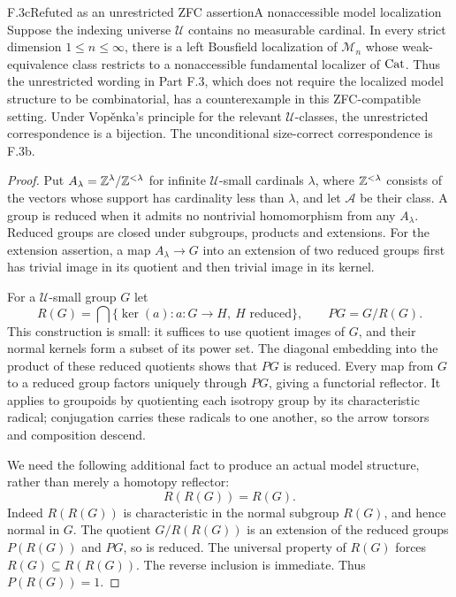 \begin{claim}{F.3c}{Refuted as an unrestricted ZFC assertion}{A nonaccessible model localization}
Suppose the indexing universe $\mathcal U$ contains no measurable
cardinal. In every strict dimension $1\leq n\leq\infty$, there
is a left Bousfield localization of $\mathcal M_n$ whose
weak-equivalence class restricts to a nonaccessible fundamental
localizer of $\mathrm{Cat}$. Thus the unrestricted wording in Part F.3,
which does not require the localized model structure to be
combinatorial, has a counterexample in this ZFC-compatible setting.
Under Vop\v{e}nka's principle for the relevant $\mathcal U$-classes,
the unrestricted correspondence is a bijection. The unconditional
size-correct correspondence is F.3b.
\end{claim}
\begin{proof}
Put $A_\lambda=\mathbb Z^\lambda/\mathbb Z^{<\lambda}$ for infinite
$\mathcal U$-small cardinals $\lambda$, where $\mathbb Z^{<\lambda}$
consists of the vectors whose support has cardinality less than
$\lambda$, and let $\mathcal A$
be their class. A group is reduced when it admits no nontrivial
homomorphism from any $A_\lambda$. Reduced groups are closed
under subgroups, products and extensions. For the extension
assertion, a map $A_\lambda\to G$ into an extension of two
reduced groups first has trivial image in its quotient and then
trivial image in its kernel.

For a $\mathcal U$-small group $G$ let
\[
 R(G)=\bigcap\{\ker(a):a:G\to H,\ H\text{ reduced}\},
 \qquad P G=G/R(G).
\]
This construction is small: it suffices to use quotient images
of $G$, and their normal kernels form a subset of its power set.
The diagonal embedding into the product of these reduced quotients
shows that $PG$ is reduced. Every map from $G$ to a reduced group
factors uniquely through $PG$, giving a functorial reflector.
It applies to groupoids by quotienting each isotropy group by its
characteristic radical; conjugation carries these radicals to
one another, so the arrow torsors and composition descend.

We need the following additional fact to produce an actual model
structure, rather than merely a homotopy reflector:
\[
                 R(R(G))=R(G).                              \tag{F.3.3}
\]
Indeed $R(R(G))$ is characteristic in the normal subgroup $R(G)$,
and hence normal in $G$. The quotient $G/R(R(G))$ is an extension
of the reduced groups $P(R(G))$ and $PG$, so is reduced. The
universal property of $R(G)$ forces $R(G)\subseteq R(R(G))$.
The reverse inclusion is immediate. Thus $P(R(G))=1$.


\end{proof}
